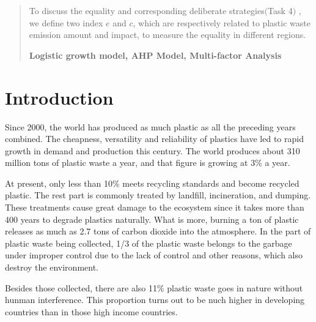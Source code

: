 \documentclass{mcmthesis}
\begin{document}
\begin{abstract}
        To discuss the equality and corresponding deliberate strategies$($Task 4$)$
		, we define two index $e$ and $c$, which are respectively related to plastic waste emission amount and impact, to measure the equality in different regions.  



 


		
	 
	   \begin{keywords}
		\textbf{Logistic growth model, AHP Model, Multi-factor Analysis}%
		
		\end{keywords}
		
	\end{abstract}

\maketitle


\tableofcontents
\newpage

\section{Introduction}
Since 2000, the world has produced as much plastic as all the preceding years combined. The cheapness, versatility and reliability of plastics have led to rapid growth in demand and production this century. The world produces about 310 million tons of plastic waste a year, and that figure is growing at 3\% a year.\par
At present, only less than 10\% meets recycling standards and become recycled plastic. The rest part is commonly treated by landfill, incineration, and dumping. These treatments cause great damage to the ecosystem since it takes more than 400 years to degrade plastics naturally. What is more, burning a ton of plastic releases as much as 2.7 tons of carbon dioxide into the atmosphere. In the part of plastic waste being collected, 1/3 of the plastic waste belongs to the garbage under improper control due to the lack of control and other reasons, which also destroy the environment.

Besides those collected, there are also 11\% plastic waste goes in nature without hunman interference. This proportion turns out to be nuch higher in developing countries than in those high income countries. 
\end{document}
